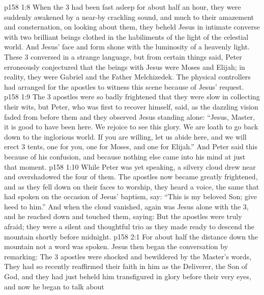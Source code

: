 \vs p158 1:8 When the 3 had been fast asleep for about half an hour, they were suddenly awakened by a near\hyp{}by crackling sound, and much to their amazement and consternation, on looking about them, they beheld Jesus in intimate converse with two brilliant beings clothed in the habiliments of the light of the celestial world. And Jesus’ face and form shone with the luminosity of a heavenly light. These 3 conversed in a strange language, but from certain things said, Peter erroneously conjectured that the beings with Jesus were Moses and Elijah; in reality, they were Gabriel and the Father Melchizedek. The physical controllers had arranged for the apostles to witness this scene because of Jesus’ request.
\vs p158 1:9 The 3 apostles were so badly frightened that they were slow in collecting their wits, but Peter, who was first to recover himself, said, as the dazzling vision faded from before them and they observed Jesus standing alone: “Jesus, Master, it is good to have been here. We rejoice to see this glory. We are loath to go back down to the inglorious world. If you are willing, let us abide here, and we will erect 3 tents, one for you, one for Moses, and one for Elijah.” And Peter said this because of his confusion, and because nothing else came into his mind at just that moment.
\vs p158 1:10 While Peter was yet speaking, a silvery cloud drew near and overshadowed the four of them. The apostles now became greatly frightened, and as they fell down on their faces to worship, they heard a voice, the same that had spoken on the occasion of Jesus’ baptism, say: “This is my beloved Son; give heed to him.” And when the cloud vanished, again was Jesus alone with the 3, and he reached down and touched them, saying:  But the apostles were truly afraid; they were a silent and thoughtful trio as they made ready to descend the mountain shortly before midnight.
\vs p158 2:1 For about half the distance down the mountain not a word was spoken. Jesus then began the conversation by remarking:  The 3 apostles were shocked and bewildered by the Master’s words,  They had so recently reaffirmed their faith in him as the Deliverer, the Son of God, and they had just beheld him transfigured in glory before their very eyes, and now he began to talk about 
